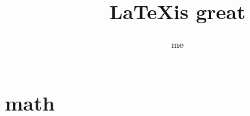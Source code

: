 \documentclass[12pt,oneside]{book}
\begin{document}
  \title{\LaTeX is great}
  \author{me}
  \maketitle
  
    
  \clearpage
   \tableofcontents
    \clearpage
    \listoftables
    \clearpage
    \listoffigures

    \begin{singlespace}
    \renewcommand{\glossarypreamble}{\thispagestyle{myheadings}} %
    \printglossary[type=\acronymtype]
    \clearpage
    \end{singlespace}

     
     


    \appendix
    \chapter{math}
    \renewcommand{\bibname}{REFERENCES}
    \begin{singlespace}
    \printbibliography
    \end{singlespace}
\end{document}
